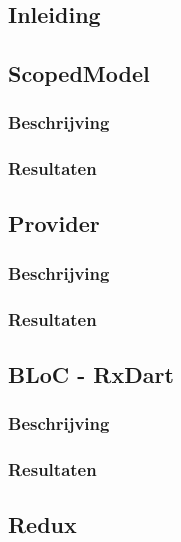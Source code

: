 

\chapter{}
\label{ch:experiment}

\section{Inleiding}

\section{ScopedModel}
\subsection{Beschrijving}
\subsection{Resultaten}

\section{Provider}
\subsection{Beschrijving}
\subsection{Resultaten}

\section{BLoC - RxDart}
\subsection{Beschrijving}
\subsection{Resultaten}

\section{Redux}
